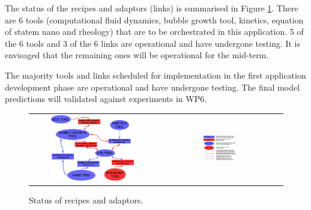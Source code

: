 The status of the recipes and adaptors (links) is summarised in Figure
\ref{fig:recipesAdaptorsStatus}.  There are 6 tools (computational fluid
dynamics, bubble growth tool, kinetics, equation of statem nano and rheology)
that are to be orchestrated in this application. 5 of the 6 tools and 3 of the 6
links are operational and have undergone testing. It is envisaged that the
remaining ones will be operational for the mid-term.

The majority tools and links scheduled for implementation in the first
application development phase are operational and have undergone testing. The
final model predictions will validated against experiments in WP6.

\begin{figure}
  \centering
  \begin{tabular}{cc}
    \includegraphics[width=0.70\textwidth,keepaspectratio=true]{./Content/Figures/PU_exercise_1.eps} &
    \includegraphics[width=0.27\textwidth,keepaspectratio=true]{./Content/Figures/PU_exercise_8.eps}
  \end{tabular}
  \caption{Status of recipes and adaptors.}
  \label{fig:recipesAdaptorsStatus}
\end{figure}
